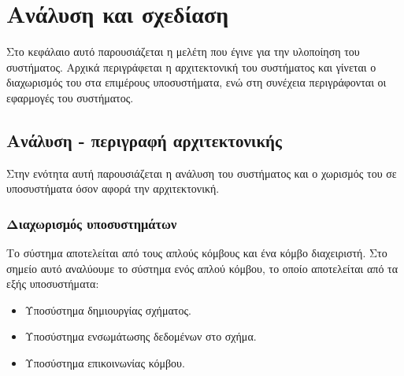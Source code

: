 \chapter{Ανάλυση και σχεδίαση}
Στο κεφάλαιο αυτό παρουσιάζεται η μελέτη που έγινε για την
υλοποίηση του συστήματος. Αρχικά περιγράφεται η αρχιτεκτονική του
συστήματος και γίνεται ο διαχωρισμός του στα επιμέρους
υποσυστήματα, ενώ στη συνέχεια περιγράφονται οι εφαρμογές του
συστήματος.

\section{Ανάλυση - περιγραφή αρχιτεκτονικής}
Στην ενότητα αυτή παρουσιάζεται η ανάλυση του συστήματος και ο
χωρισμός του σε υποσυστήματα όσον αφορά την αρχιτεκτονική.

\subsection{Διαχωρισμός υποσυστημάτων}
Το σύστημα αποτελείται από τους απλούς κόμβους και ένα κόμβο
διαχειριστή. Στο σημείο αυτό αναλύουμε το σύστημα ενός απλού
κόμβου, το οποίο αποτελείται από τα εξής υποσυστήματα:

\begin{itemize}
\item Υποσύστημα δημιουργίας σχήματος.
\item Υποσύστημα ενσωμάτωσης δεδομένων στο σχήμα.
\item Υποσύστημα επικοινωνίας κόμβου.
\end{itemize}



